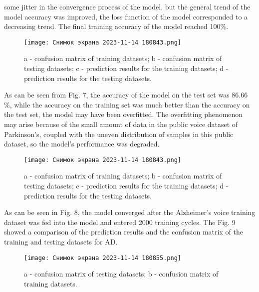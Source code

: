 some jitter in the convergence process of the model, but
the general trend of the model accuracy was improved,
the loss function of the model corresponded to a decreasing trend. The final training accuracy of the model
reached 100\%.


\begin{figure}[!h]
\centering
\texttt{[image: Снимок экрана 2023-11-14 180843.png]}
\caption{a - confusion matrix of training datasets; b - confusion matrix
of testing datasets; c - prediction results for the training datasets; d -
prediction results for the testing datasets.}
\end{figure}


As can be seen from Fig. 7, the accuracy of the model
on the test set was 86.66 \%, while the accuracy on the
training set was much better than the accuracy on the test
set, the model may have been overfitted. The overfitting
phenomenon may arise because of the small amount of
data in the public voice dataset of Parkinson’s, coupled
with the uneven distribution of samples in this public
dataset, so the model’s performance was degraded.


\begin{figure}[!h]
\centering
\texttt{[image: Снимок экрана 2023-11-14 180843.png]}
\caption{a - confusion matrix of training datasets; b - confusion matrix
of testing datasets; c - prediction results for the training datasets; d -
prediction results for the testing datasets.}
\end{figure}


\par
As can be seen in Fig. 8, the model converged after the
Alzheimer’s voice training dataset was fed into the model
and entered 2000 training cycles. The Fig. 9 showed a
comparison of the prediction results and the confusion
matrix of the training and testing datasets for AD.


\begin{figure}[!h]
\centering
\texttt{[image: Снимок экрана 2023-11-14 180855.png]}
\caption{a - confusion matrix of testing datasets; b - confusion matrix
of training datasets.}
\end{figure}


